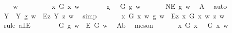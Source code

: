 \begin{isabellebody}
\isacommand{{\isacharbraceleft}}\isamarkupfalse%
\isanewline
\ \ \isamarkupfalse%
\ w\ \isanewline
\ \ \isacommand{{\isacharbraceleft}}\isamarkupfalse%
\isanewline
\ \ \ \ \isamarkupfalse%
\ {\isachardoublequoteopen}{\isasymexists}x{\isachardot}\ G\ x\ w{\isachardoublequoteclose}\isanewline
\ \ \ \ \isamarkupfalse%
\ \isamarkupfalse%
\ g\ \ {}{\isacharcolon}\ {\isachardoublequoteopen}G\ g\ w{\isachardoublequoteclose}\ \isacommand{{\isachardot}{\isachardot}}\isamarkupfalse%
\isanewline
\ \ \ \ \isamarkupfalse%
\ {\isachardoublequoteopen}NE\ g\ w{\isachardoublequoteclose}\ \isamarkupfalse%
\ A{}\ \isamarkupfalse%
\ auto\isanewline
\ \ \ \ \isamarkupfalse%
\ {\isachardoublequoteopen}{\isasymforall}Y{\isachardot}\ {\isacharparenleft}{\isasymE}\ Y\ g\ w{\isacharparenright}\ {\isasymlongrightarrow}\ {\isacharparenleft}\isactrlbold {\isasymbox}{\isacharparenleft}\isactrlbold {\isasymexists}\isactrlsup Ez{\isachardot}\ {\isasymlparr}Y\ z{\isasymrparr}{\isacharparenright}{\isacharparenright}\ w{\isachardoublequoteclose}\ \isamarkupfalse%
\ simp\isanewline
\ \ \ \ \isamarkupfalse%
\ {\isachardoublequoteopen}{\isacharparenleft}{\isasymE}\ {\isacharparenleft}{\isasymlambda}x{\isachardot}\ G\ x\ w{\isacharparenright}\ g\ w{\isacharparenright}\ {\isasymlongrightarrow}\ {\isacharparenleft}\isactrlbold {\isasymbox}{\isacharparenleft}\isactrlbold {\isasymexists}\isactrlsup Ez{\isachardot}\ {\isasymlparr}{\isacharparenleft}{\isasymlambda}x{\isachardot}\ G\ x\ w{\isacharparenright}\ z{\isasymrparr}{\isacharparenright}{\isacharparenright}\ w{\isachardoublequoteclose}\ \isamarkupfalse%
\ {\isacharparenleft}rule\ allE{\isacharparenright}\isanewline
\ \ \ \ \isamarkupfalse%
\ {}{\isacharcolon}\ {\isachardoublequoteopen}{\isacharparenleft}{\isacharparenleft}{\isasymE}\ {\isasymdown}G{\isacharparenright}\ g\ w{\isacharparenright}\ {\isasymlongrightarrow}\ {\isacharparenleft}\isactrlbold {\isasymbox}{\isacharparenleft}\isactrlbold {\isasymexists}\isactrlsup E\ G{\isacharparenright}{\isacharparenright}\ w{\isachardoublequoteclose}\ \isamarkupfalse%
\ A{}b\ \isamarkupfalse%
\ meson\isanewline
\ \ \ \ \isamarkupfalse%
\ \ {\isachardoublequoteopen}{\isacharparenleft}\isactrlbold {\isasymforall}x{\isachardot}\ G\ x\ \isactrlbold {\isasymrightarrow}\ {\isacharparenleft}{\isacharparenleft}{\isasymE}\ {\isasymdown}G{\isacharparenright}\ x{\isacharparenright}{\isacharparenright}\ w{\isachardoublequoteclose}\ \isamarkupfalse%

\end{isabellebody}
